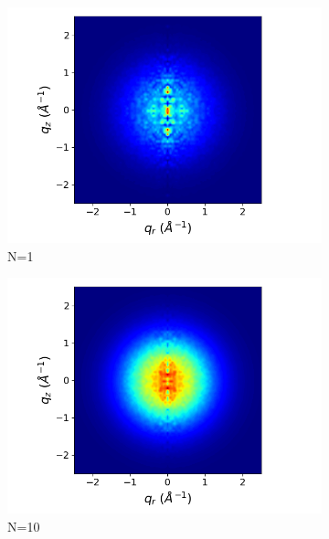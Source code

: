 \documentclass{article}
\begin{document}
  \begin{figure}[!htb]
  \centering
  \begin{subfigure}{0.45\linewidth}
  \centering
  \includegraphics[width=\textwidth]{xrd_1frame.png}
  \caption{N=1}
  \end{subfigure}
  \begin{subfigure}{0.45\linewidth}
  \centering
  \includegraphics[width=\textwidth]{xrd_10frame.png}
  \caption{N=10}
  \end{subfigure}
  \begin{subfigure}{0.45\linewidth}
  \centering

\end{subfigure}
\end{figure}
\end{document}

